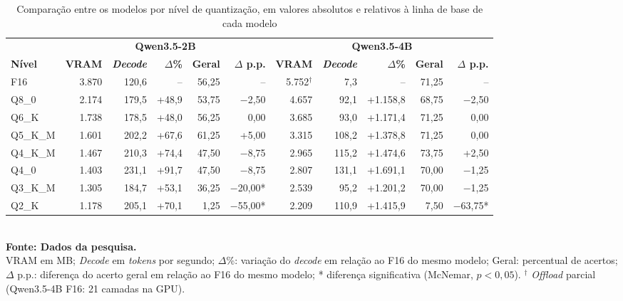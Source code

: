 \begin{table}[htb]
\centering
\caption{Comparação entre os modelos por nível de quantização, em valores absolutos e relativos à linha de base de cada modelo}
\label{tab:comparacao}
\small
\begin{tabular}{lrrrrrrrrrr}
\hline
 & \multicolumn{5}{c}{\textbf{Qwen3.5-2B}} & \multicolumn{5}{c}{\textbf{Qwen3.5-4B}} \\
\textbf{Nível} & \textbf{VRAM} & \textbf{\textit{Decode}} & \textbf{$\Delta$\%} & \textbf{Geral} & \textbf{$\Delta$ p.p.} & \textbf{VRAM} & \textbf{\textit{Decode}} & \textbf{$\Delta$\%} & \textbf{Geral} & \textbf{$\Delta$ p.p.} \\
\hline
F16 & 3.870 & 120,6 & -- & 56,25 & -- & 5.752$^\dagger$ & 7,3 & -- & 71,25 & -- \\
Q8\_0 & 2.174 & 179,5 & +48,9 & 53,75 & $-$2,50 & 4.657 & 92,1 & +1.158,8 & 68,75 & $-$2,50 \\
Q6\_K & 1.738 & 178,5 & +48,0 & 56,25 & 0,00 & 3.685 & 93,0 & +1.171,4 & 71,25 & 0,00 \\
Q5\_K\_M & 1.601 & 202,2 & +67,6 & 61,25 & +5,00 & 3.315 & 108,2 & +1.378,8 & 71,25 & 0,00 \\
Q4\_K\_M & 1.467 & 210,3 & +74,4 & 47,50 & $-$8,75 & 2.965 & 115,2 & +1.474,6 & 73,75 & +2,50 \\
Q4\_0 & 1.403 & 231,1 & +91,7 & 47,50 & $-$8,75 & 2.807 & 131,1 & +1.691,1 & 70,00 & $-$1,25 \\
Q3\_K\_M & 1.305 & 184,7 & +53,1 & 36,25 & $-$20,00* & 2.539 & 95,2 & +1.201,2 & 70,00 & $-$1,25 \\
Q2\_K & 1.178 & 205,1 & +70,1 & 1,25 & $-$55,00* & 2.209 & 110,9 & +1.415,9 & 7,50 & $-$63,75* \\
\hline
\end{tabular}
\\[2pt]{\footnotesize \textbf{Fonte: Dados da pesquisa.}}
\\[2pt]{\footnotesize VRAM em MB; \textit{Decode} em \textit{tokens} por segundo; $\Delta$\%: variação do \textit{decode} em relação ao F16 do mesmo modelo; Geral: percentual de acertos; $\Delta$ p.p.: diferença do acerto geral em relação ao F16 do mesmo modelo; * diferença significativa (McNemar, $p < 0{,}05$). $^\dagger$ \textit{Offload} parcial (Qwen3.5-4B F16: 21 camadas na GPU).}
\end{table}
